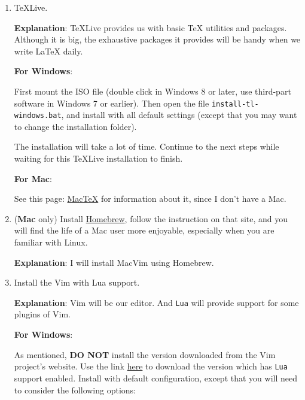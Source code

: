 \documentclass{article}
\begin{document}
\begin{enumerate}
    \item \TeX Live.

        \textbf{Explanation}: \TeX Live provides us with basic \TeX
        utilities and packages. Although it is big, the exhaustive
        packages it provides will be handy when we write \LaTeX{} daily.

        \textbf{For Windows}:

        First mount the ISO file (double click in Windows 8 or later,
        use third-part software in Windows 7 or earlier). Then open
        the file \texttt{install-tl-windows.bat}, and install with all
        default settings (except that you may want to change the
        installation folder).

        The installation will take a lot of time. Continue to the next
        steps while waiting for this \TeX Live installation to finish.

        \textbf{For Mac}:

        See this page: \href{https://www.tug.org/mactex/}{Mac\TeX} for
        information about it, since I don't have a Mac.


    \item (\textbf{Mac} only) Install
        \href{https://brew.sh}{Homebrew}, follow the instruction on
        that site, and you will find the life of a Mac user more
        enjoyable, especially when you are familiar with Linux.

        \textbf{Explanation}: I will install MacVim using Homebrew.

    \item Install the Vim with Lua support. 

        \textbf{Explanation}: Vim will be our editor. And \texttt{Lua}
        will provide support for some plugins of Vim.
        
        \textbf{For Windows}:

        As mentioned, \textbf{DO NOT} install the version downloaded
        from the Vim project's website. Use the link
        \href{https://github.com/vim/vim-win32-installer/releases/}{here}
        to download the version which has \texttt{Lua} support
        enabled. Install with default configuration, except that you
        will need to consider the following options:


\end{enumerate}
\end{document}
